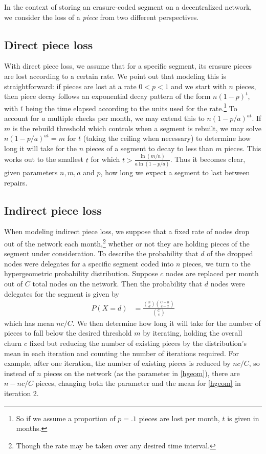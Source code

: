 In the context of storing an erasure-coded segment on a decentralized network, we consider the loss of a {\em piece} from two different perspectives.

\subsection{Direct piece loss}
With direct piece loss, we assume that for a specific segment, its erasure pieces are lost according to a certain rate. We point out that modeling this is straightforward: if pieces are lost at a rate $0<p<1$ and we start with $n$ pieces, then piece decay follows an exponential decay pattern of the form $n(1-p)^t$, with $t$ being the time elapsed according to the units used for the rate.\footnote{So if we assume a proportion of $p=.1$ pieces are lost per month, $t$ is given in months.}
To account for $a$ multiple checks per month, we may extend this to $n(1-p/a)^{at}$. If $m$ is the rebuild threshold which controls when a segment is rebuilt, we may solve $n(1-p/a)^{at}=m$ for $t$ (taking the ceiling when necessary) to determine how long it will take for the $n$ pieces of a segment to decay to less than $m$ pieces. This works out to the smallest $t$ for which
$t>\frac{\ln(m/n)}{a\ln(1-p/a)}$. Thus it becomes clear, given parameters $n,m,a$ and $p$, how long we expect a segment to last between repairs.

\subsection{Indirect piece loss}

When modeling indirect piece loss, we suppose that a fixed rate of nodes
drop out of the network each month,\footnote{Though the rate may be taken over
any desired time interval.} whether or not they are holding pieces of the segment
under consideration. To describe the probability that $d$ of the dropped nodes
were delegates for a specific segment coded into $n$ pieces, we turn to the
hypergeometric probability distribution. Suppose $c$ nodes are replaced per
month out of $C$ total nodes on the network. Then the probability that $d$
nodes were delegates for the segment is given by
\begin{align}
&&    P(X=d)&=\frac{\binom{n}{d}\binom{C-n}{c-d}}{\binom{C}{c}}\label{hgeom} &&
\end{align}
which has mean $nc/C$. We then determine how long it will take for the number of pieces to fall below the desired threshold $m$ by iterating, holding the overall churn $c$ fixed but reducing the number of existing pieces by the distribution's mean in each iteration and counting the number of iterations required. For example, after one iteration, the number of existing pieces is reduced by $nc/C$, so instead of $n$ pieces on the network (as the parameter in \eqref{hgeom}), there are $n-nc/C$ pieces, changing both the parameter and the mean for \eqref{hgeom} in iteration 2.

